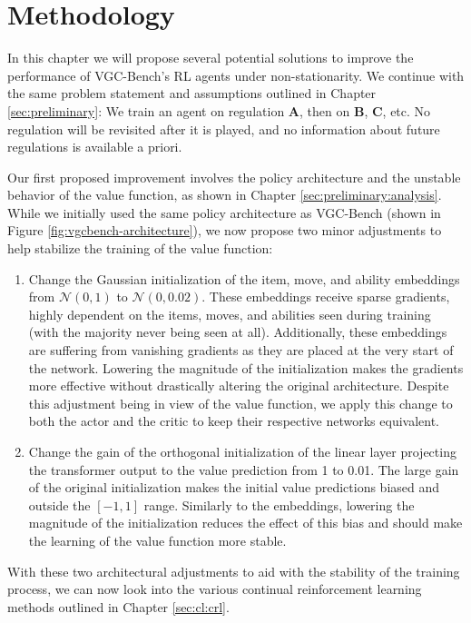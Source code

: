 %
%
\chapter{Methodology} \label{sec:methodology}
In this chapter we will propose several potential solutions to improve the performance of VGC-Bench's RL agents under non-stationarity.
We continue with the same problem statement and assumptions outlined in Chapter \ref{sec:preliminary}: We train an agent on regulation \textbf{A}, then on \textbf{B}, \textbf{C}, etc.
No regulation will be revisited after it is played, and no information about future regulations is available a priori.

Our first proposed improvement involves the policy architecture and the unstable behavior of the value function, as shown in Chapter \ref{sec:preliminary:analysis}.
While we initially used the same policy architecture as VGC-Bench (shown in Figure \ref{fig:vgcbench-architecture}), we now propose two minor adjustments to help stabilize the training of the value function:

\begin{enumerate}
    \item Change the Gaussian initialization of the item, move, and ability embeddings from $\mathcal{N}(0, 1)$ to $\mathcal{N}(0, 0.02)$. These embeddings receive sparse gradients, highly dependent on the items, moves, and abilities seen during training (with the majority never being seen at all). Additionally, these embeddings are suffering from vanishing gradients as they are placed at the very start of the network. Lowering the magnitude of the initialization makes the gradients more effective without drastically altering the original architecture. Despite this adjustment being in view of the value function, we apply this change to both the actor and the critic to keep their respective networks equivalent.
    \item Change the gain of the orthogonal initialization of the linear layer projecting the transformer output to the value prediction from 1 to 0.01. The large gain of the original initialization makes the initial value predictions biased and outside the $[-1, 1]$ range. Similarly to the embeddings, lowering the magnitude of the initialization reduces the effect of this bias and should make the learning of the value function more stable.
\end{enumerate}

With these two architectural adjustments to aid with the stability of the training process, we can now look into the various continual reinforcement learning methods outlined in Chapter \ref{sec:cl:crl}.


